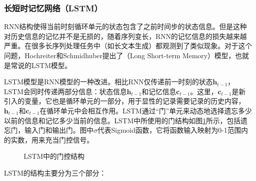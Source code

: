 \subsubsection{长短时记忆网络（LSTM）}
\label{sec:6.3.3.2}

\parinterval RNN结构使得当前时刻循环单元的状态包含了之前时间步的状态信息。但是这种对历史信息的记忆并不是无损的，随着序列变长，RNN的记忆信息的损失越来越严重。在很多长序列处理任务中（如长文本生成）都观测到了类似现象。对于这个问题，Hochreiter和Schmidhuber提出了{\small{}}（Long Short-term Memory）模型，也就是常说的LSTM模型\cite{HochreiterLong}。

\parinterval LSTM模型是RNN模型的一种改进。相比RNN仅传递前一时刻的状态$\mathbf{h}_{t-1}$，LSTM会同时传递两部分信息：状态信息$\mathbf{h}_{t-1}$和记忆信息$\mathbf{c}_{t-1}$。这里，$\mathbf{c}_{t-1}$是新引入的变量，它也是循环单元的一部分，用于显性的记录需要记录的历史内容，$\mathbf{h}_{t-1}$和$\mathbf{c}_{t-1}$在循环单元中会相互作用。LSTM通过``门''单元来动态地选择遗忘多少以前的信息和记忆多少当前的信息。LSTM中所使用的门结构如图\ref{fig:6-15}所示，包括遗忘门，输入门和输出门。图中$\sigma$代表Sigmoid函数，它将函数输入映射为0-1范围内的实数，用来充当门控信号。

\begin{figure}[htp]
\centering
\subfigure[遗忘门]{}
\subfigure[输入门]{}
\subfigure[记忆更新]{}
\subfigure[输出门]{}
\caption{LSTM中的门控结构}
\label{fig:6-15}
\end{figure}

\parinterval LSTM的结构主要分为三个部分：

